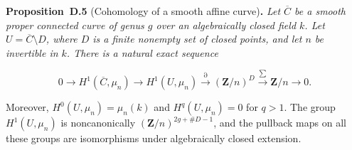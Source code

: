 \documentclass[11pt]{article}
\newenvironment{bpstatement}[2]{\par\addvspace{0.6\baselineskip}\noindent\textbf{#1}#2\textbf{.}\enspace\ignorespaces}
  {\par\addvspace{0.4\baselineskip}}
\newenvironment{bpstatementit}[2]{\begin{bpstatement}{#1}{#2}\itshape\ignorespaces}{\end{bpstatement}}
\begin{document}
\label{bp15}%
\begin{bpstatementit}{Proposition~D.5}{ (Cohomology of a smooth affine curve)}
Let \(\overline C\) be a smooth proper connected curve of genus \(g\) over an algebraically closed field \(k\).  Let \(U=\overline C\setminus D\), where \(D\) is a finite nonempty set of closed points, and let \(n\) be invertible in \(k\).  There is a natural exact sequence

\[
0\longrightarrow H^1(\overline C,\mu_n)
\longrightarrow H^1(U,\mu_n)
\xrightarrow{\partial}(\mathbf Z/n)^D
\xrightarrow{\sum}\mathbf Z/n\longrightarrow0.
\tag{D.1}
\]

Moreover, \(H^0(U,\mu_n)=\mu_n(k)\) and \(H^q(U,\mu_n)=0\) for \(q>1\). The group \(H^1(U,\mu_n)\) is noncanonically \((\mathbf Z/n)^{2g+\#D-1}\), and the pullback maps on all these groups are isomorphisms under algebraically closed extension.
\end{bpstatementit}
\end{document}
